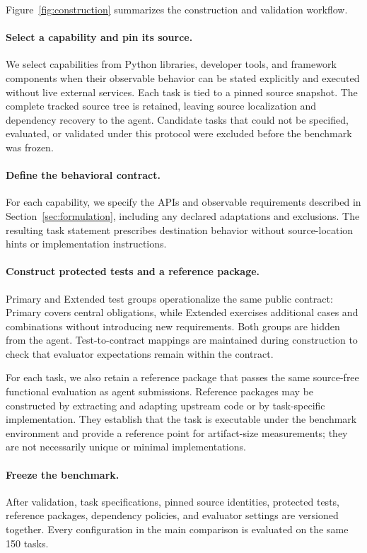 \documentclass[acmsmall,screen,review,anonymous]{acmart}
\begin{document}
Figure~\ref{fig:construction} summarizes the construction and validation
workflow.
\paragraph{Select a capability and pin its source.}
We select capabilities from Python libraries, developer tools, and framework
components when their observable behavior can be stated explicitly and executed
without live external services. Each task is tied to a pinned source snapshot.
The complete tracked source tree is retained, leaving source localization and
dependency recovery to the agent.
Candidate tasks that could not be specified, evaluated, or validated under this
protocol were excluded before the benchmark was frozen.

\paragraph{Define the behavioral contract.}
For each capability, we specify the APIs and observable requirements described
in Section~\ref{sec:formulation}, including any declared adaptations and exclusions.
The resulting task statement prescribes destination behavior without
source-location hints or implementation instructions.

\paragraph{Construct protected tests and a reference package.}
Primary and Extended test groups operationalize the same public contract:
Primary covers central obligations, while Extended exercises additional cases
and combinations without introducing new requirements. Both groups are hidden
from the agent. Test-to-contract mappings are maintained during construction to
check that evaluator expectations remain within the contract.

For each task, we also retain a reference package that passes the same
source-free functional evaluation as agent submissions. Reference packages may
be constructed by extracting and adapting upstream code or by task-specific
implementation. They establish that the task is executable under the benchmark
environment and provide a reference point for artifact-size measurements;
they are not necessarily unique or minimal implementations.

\paragraph{Freeze the benchmark.}
After validation, task specifications, pinned source identities, protected
tests, reference packages, dependency policies, and evaluator settings are
versioned together. Every configuration in the main comparison is evaluated on
the same 150 tasks.
\end{document}
